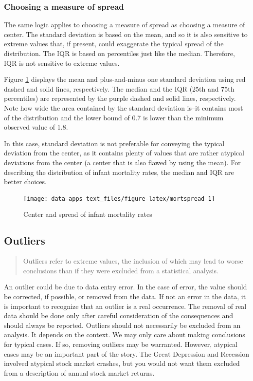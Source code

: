 \documentclass[
]{book}
\begin{document}
\hypertarget{choosing-a-measure-of-spread}{%
\subsubsection*{Choosing a measure of spread}\label{choosing-a-measure-of-spread}}


The same logic applies to choosing a measure of spread as choosing a measure of center. The standard deviation is based on the mean, and so it is also sensitive to extreme values that, if present, could exaggerate the typical spread of the distribution. The IQR is based on percentiles just like the median. Therefore, IQR is not sensitive to extreme values.

Figure \ref{fig:mortspread} displays the mean and plus-and-minus one standard deviation using red dashed and solid lines, respectively. The median and the IQR (25th and 75th percentiles) are represented by the purple dashed and solid lines, respectively. Note how wide the area contained by the standard deviation is--it contains most of the distribution and the lower bound of 0.7 is lower than the minimum observed value of 1.8.

In this case, standard deviation is not preferable for conveying the typical deviation from the center, as it contains plenty of values that are rather atypical deviations from the center (a center that is also flawed by using the mean). For describing the distribution of infant mortality rates, the median and IQR are better choices.

\begin{figure}

{\centering \texttt{[image: data-apps-text\_files/figure-latex/mortspread-1]} 

}

\caption{Center and spread of infant mortality rates}\label{fig:mortspread}
\end{figure}

\hypertarget{outliers}{%
\subsection{Outliers}\label{outliers}}

\begin{quote}
Outliers refer to extreme values, the inclusion of which may lead to worse conclusions than if they were excluded from a statistical analysis.
\end{quote}

An outlier could be due to data entry error. In the case of error, the value should be corrected, if possible, or removed from the data. If not an error in the data, it is important to recognize that an outlier is a real occurrence. The removal of real data should be done only after careful consideration of the consequences and should always be reported. Outliers should not necessarily be excluded from an analysis. It depends on the context. We may only care about making conclusions for typical cases. If so, removing outliers may be warranted. However, atypical cases may be an important part of the story. The Great Depression and Recession involved atypical stock market crashes, but you would not want them excluded from a description of annual stock market returns.
\end{document}
